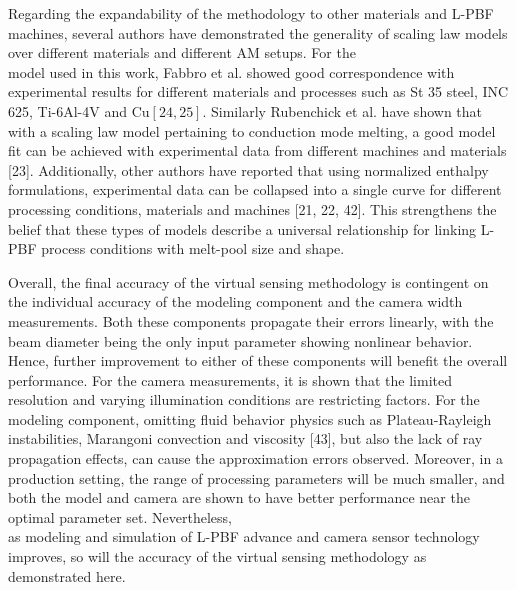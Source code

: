 \documentclass[10pt]{article}
\begin{document}
Regarding the expandability of the methodology to other materials and L-PBF machines, several authors have demonstrated the generality of scaling law models over different materials and different AM setups. For the\\
model used in this work, Fabbro et al. showed good correspondence with experimental results for different materials and processes such as St 35 steel, INC 625, Ti-6Al-4V and $\mathrm{Cu}[24,25]$. Similarly Rubenchick et al. have shown that with a scaling law model pertaining to conduction mode melting, a good model fit can be achieved with experimental data from different machines and materials [23]. Additionally, other authors have reported that using normalized enthalpy formulations, experimental data can be collapsed into a single curve for different processing conditions, materials and machines [21, 22, 42]. This strengthens the belief that these types of models describe a universal relationship for linking L-PBF process conditions with melt-pool size and shape.

Overall, the final accuracy of the virtual sensing methodology is contingent on the individual accuracy of the modeling component and the camera width measurements. Both these components propagate their errors linearly, with the beam diameter being the only input parameter showing nonlinear behavior. Hence, further improvement to either of these components will benefit the overall performance. For the camera measurements, it is shown that the limited resolution and varying illumination conditions are restricting factors. For the modeling component, omitting fluid behavior physics such as Plateau-Rayleigh instabilities, Marangoni convection and viscosity [43], but also the lack of ray propagation effects, can cause the approximation errors observed. Moreover, in a production setting, the range of processing parameters will be much smaller, and both the model and camera are shown to have better performance near the optimal parameter set. Nevertheless,\\
as modeling and simulation of L-PBF advance and camera sensor technology improves, so will the accuracy of the virtual sensing methodology as demonstrated here.
\end{document}
